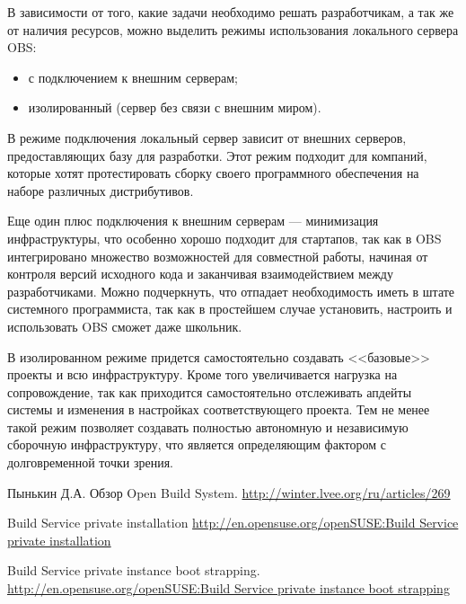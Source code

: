 \documentclass[10pt, a5paper]{article}
\begin{document}
В зависимости от того, какие задачи необходимо решать разработчикам, а так же от наличия ресурсов, можно выделить режимы использования локального сервера OBS:

\begin{itemize}
	\item с подключением к внешним серверам;
	\item изолированный (сервер без связи с внешним миром).
\end{itemize}

В режиме подключения локальный сервер зависит от внешних серверов,  предоставляющих базу для разработки. Этот режим подходит для компаний, которые хотят протестировать сборку своего программного обеспечения на наборе различных дистрибутивов.

Еще один плюс подключения к внешним серверам --- минимизация инфраструктуры, что особенно хорошо подходит для стартапов, так как в OBS интегрировано множество возможностей для совместной работы, начиная от контроля версий исходного кода и заканчивая взаимодействием между разработчиками. Можно подчеркнуть, что отпадает необходимость иметь в штате системного программиста, так как в простейшем случае установить, настроить и использовать OBS сможет даже школьник.

В изолированном режиме придется самостоятельно создавать <<базовые>> проекты \cite{Pynkin3} и всю инфраструктуру. Кроме того увеличивается нагрузка на сопровождение, так как приходится самостоятельно отслеживать апдейты системы и изменения в настройках соответствующего проекта. Тем не менее такой режим позволяет создавать полностью автономную и независимую сборочную инфраструктуру, что является определяющим фактором с долговременной точки зрения.

\begin{thebibliography}{9}

 Пынькин Д.А. Обзор Open Build System.
\url{http://winter.lvee.org/ru/articles/269}


 Build Service private installation \url{http://en.opensuse.org/openSUSE:Build Service private installation}

 Build Service private instance boot strapping.
\url{http://en.opensuse.org/openSUSE:Build Service private instance boot strapping}

\end{thebibliography}
\end{document}

